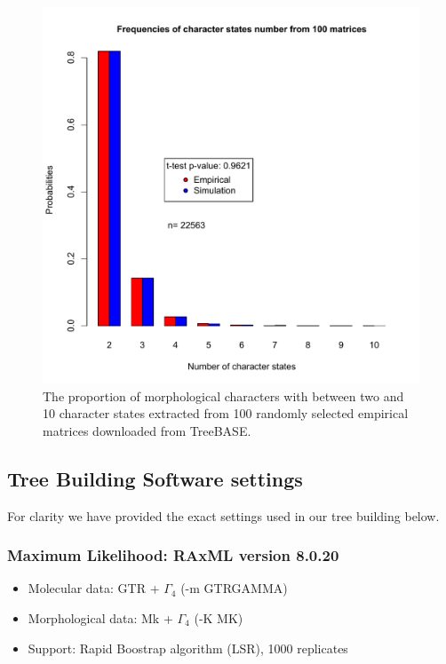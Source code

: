 \begin{figure}[h]
\centering
\includegraphics[keepaspectratio=true]{Figures/Supplementary/TEM_Fig-AppendixCharacters.pdf}
\caption{The proportion of morphological characters with between two and 10 character states extracted from 100 randomly selected empirical matrices downloaded from TreeBASE.}
\label{Fig_AppendixCharacters}
\end{figure}

\newpage
\subsection{Tree Building Software settings}

For clarity we have provided the exact settings used in our tree building below.

\subsubsection{Maximum Likelihood: RAxML version 8.0.20 \citep{Stamatakis21012014}}

\begin{itemize}
  \item Molecular data: GTR + $\Gamma_4$ (-m GTRGAMMA)
  \item Morphological data: Mk + $\Gamma_4$ (-K MK)
  \item Support: Rapid Boostrap algorithm (LSR), 1000 replicates
\end{itemize}

